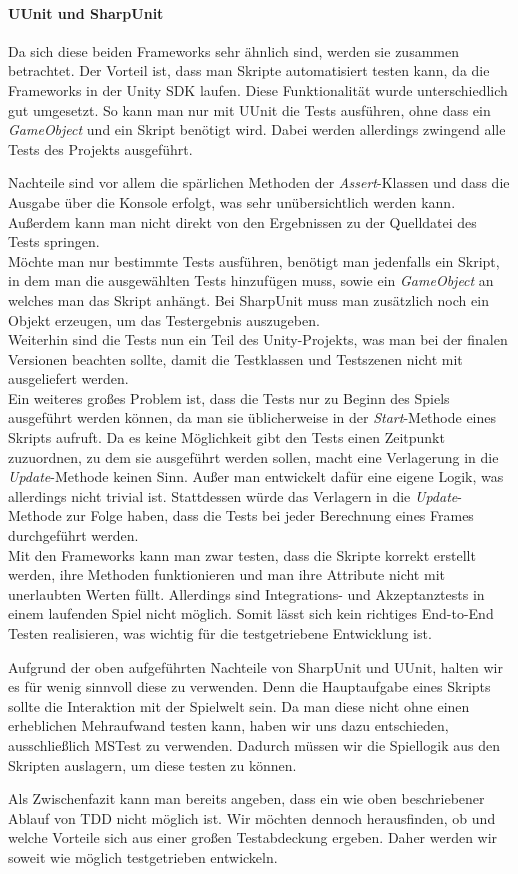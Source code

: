 \paragraph{UUnit und SharpUnit} Da sich diese beiden Frameworks sehr ähnlich sind, werden sie zusammen betrachtet. Der Vorteil ist, dass man Skripte automatisiert testen kann, da die Frameworks in der Unity SDK laufen. Diese Funktionalität wurde unterschiedlich gut umgesetzt. So kann man nur mit UUnit die Tests ausführen, ohne dass ein \textit{GameObject} und ein Skript benötigt wird. Dabei werden allerdings zwingend alle Tests des Projekts ausgeführt.

Nachteile sind vor allem die spärlichen Methoden der \textit{Assert}-Klassen und dass die Ausgabe über die Konsole erfolgt, was sehr unübersichtlich werden kann. Außerdem kann man nicht direkt von den Ergebnissen zu der Quelldatei des Tests springen.\\
Möchte man nur bestimmte Tests ausführen, benötigt man jedenfalls ein Skript, in dem man die ausgewählten Tests hinzufügen muss, sowie ein \textit{GameObject} an welches man das Skript anhängt. Bei SharpUnit muss man zusätzlich noch ein Objekt erzeugen, um das Testergebnis auszugeben.\\
Weiterhin sind die Tests nun ein Teil des Unity-Projekts, was man bei der finalen Versionen beachten sollte, damit die Testklassen und Testszenen nicht mit ausgeliefert werden.\\
Ein weiteres großes Problem ist, dass die Tests nur zu Beginn des Spiels ausgeführt werden können, da man sie üblicherweise in der \textit{Start}-Methode eines Skripts aufruft. Da es keine Möglichkeit gibt den Tests einen Zeitpunkt zuzuordnen, zu dem sie ausgeführt werden sollen, macht eine Verlagerung in die \textit{Update}-Methode keinen Sinn. Außer man entwickelt dafür eine eigene Logik, was allerdings nicht trivial ist. Stattdessen würde das Verlagern in die \textit{Update}-Methode zur Folge haben, dass die Tests bei jeder Berechnung eines Frames durchgeführt werden.\\ Mit den Frameworks kann man zwar testen, dass die Skripte korrekt erstellt werden, ihre Methoden funktionieren und man ihre Attribute nicht mit unerlaubten Werten füllt. Allerdings sind Integrations- und Akzeptanztests in einem laufenden Spiel nicht möglich. Somit lässt sich kein richtiges End-to-End Testen realisieren, was wichtig für die testgetriebene Entwicklung ist.

Aufgrund der oben aufgeführten Nachteile von SharpUnit und UUnit, halten wir es für wenig sinnvoll diese zu verwenden. Denn die Hauptaufgabe eines Skripts sollte die Interaktion mit der Spielwelt sein. Da man diese nicht ohne einen erheblichen Mehraufwand testen kann, haben wir uns dazu entschieden, ausschließlich MSTest zu verwenden. Dadurch müssen wir die Spiellogik aus den Skripten auslagern, um diese testen zu können.

Als Zwischenfazit kann man bereits angeben, dass ein wie oben beschriebener Ablauf von TDD nicht möglich ist. Wir möchten dennoch herausfinden, ob und welche Vorteile sich aus einer großen Testabdeckung ergeben. Daher werden wir soweit wie möglich testgetrieben entwickeln.